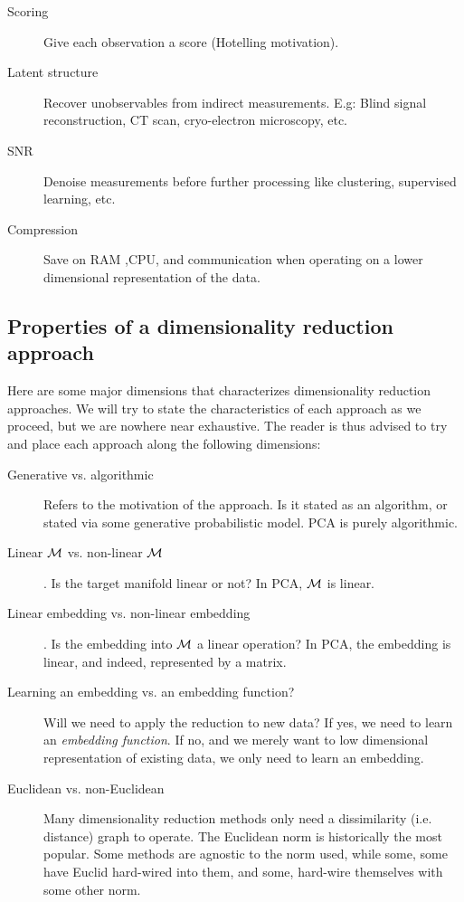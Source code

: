 \documentclass[12pt,a4paper]{article}
\begin{document}
\begin{description}
	\item [Scoring] Give each observation a score (Hotelling motivation).

	\item [Latent structure] Recover unobservables from indirect measurements. 
	E.g: Blind signal reconstruction, CT scan, cryo-electron microscopy, etc. 
	
	\item [SNR] Denoise measurements before further processing like clustering, supervised learning, etc. 
	
	\item [Compression] Save on RAM ,CPU, and communication when operating on a lower dimensional representation of the data. 
	
\end{description}







\subsection{Properties of a dimensionality reduction approach}
Here are some major dimensions that characterizes dimensionality reduction approaches. 
We will try to state the characteristics of each approach as we proceed, but we are nowhere near exhaustive.
The reader is thus advised to try and place each approach along the following dimensions:
\begin{description}
	\item [Generative vs. algorithmic] Refers to the motivation of the approach. Is it stated as an algorithm, or stated via some generative probabilistic model. 
	PCA is purely algorithmic. 

	\item [Linear $\mathcal{M}$ vs. non-linear $\mathcal{M}$]. 
	Is the target manifold linear or not?
	In PCA, $\mathcal{M}$ is linear.

	\item [Linear embedding vs. non-linear embedding]. 
	Is the embedding into $\mathcal{M}$ a linear operation?
	In PCA, the embedding is linear, and indeed, represented by a matrix. 
	
	\item [Learning an embedding vs. an embedding function?]
	Will we need to apply the reduction to new data? 
	If yes, we need to learn an \emph{embedding function}. 
	If no, and we merely want to low dimensional representation of existing data, we only need to learn an embedding. 
	
	\item [Euclidean vs. non-Euclidean] 
	Many dimensionality reduction methods only need a dissimilarity (i.e. distance) graph to operate. 
	The Euclidean norm is historically the most popular.
	Some methods are agnostic to the norm used, while some, some have Euclid hard-wired into them, and some, hard-wire themselves with some other norm. 
\end{description}
\end{document}
